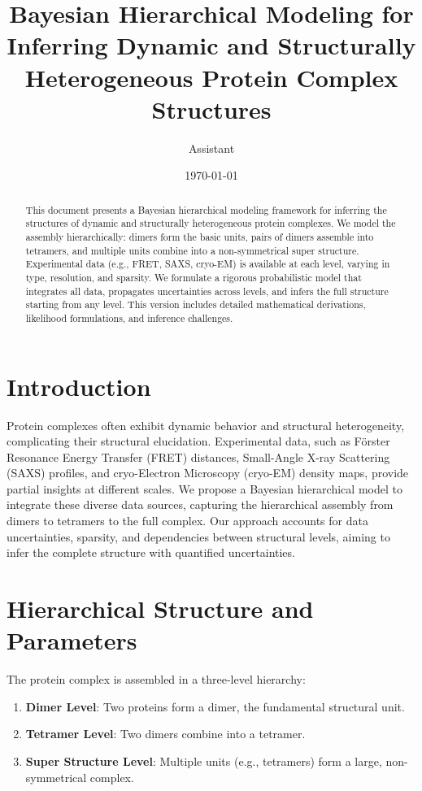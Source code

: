 \documentclass{article}
\title{Bayesian Hierarchical Modeling for Inferring Dynamic and Structurally Heterogeneous Protein Complex Structures}
\author{Assistant}
\date{\today}
\begin{document}
\maketitle

\begin{abstract}
This document presents a Bayesian hierarchical modeling framework for inferring the structures of dynamic and structurally heterogeneous protein complexes. We model the assembly hierarchically: dimers form the basic units, pairs of dimers assemble into tetramers, and multiple units combine into a non-symmetrical super structure. Experimental data (e.g., FRET, SAXS, cryo-EM) is available at each level, varying in type, resolution, and sparsity. We formulate a rigorous probabilistic model that integrates all data, propagates uncertainties across levels, and infers the full structure starting from any level. This version includes detailed mathematical derivations, likelihood formulations, and inference challenges.
\end{abstract}

\section{Introduction}
Protein complexes often exhibit dynamic behavior and structural heterogeneity, complicating their structural elucidation. Experimental data, such as Förster Resonance Energy Transfer (FRET) distances, Small-Angle X-ray Scattering (SAXS) profiles, and cryo-Electron Microscopy (cryo-EM) density maps, provide partial insights at different scales. We propose a Bayesian hierarchical model to integrate these diverse data sources, capturing the hierarchical assembly from dimers to tetramers to the full complex. Our approach accounts for data uncertainties, sparsity, and dependencies between structural levels, aiming to infer the complete structure with quantified uncertainties.

\section{Hierarchical Structure and Parameters}
The protein complex is assembled in a three-level hierarchy:
\begin{enumerate}
    \item \textbf{Dimer Level}: Two proteins form a dimer, the fundamental structural unit.
    \item \textbf{Tetramer Level}: Two dimers combine into a tetramer.
    \item \textbf{Super Structure Level}: Multiple units (e.g., tetramers) form a large, non-symmetrical complex.
\end{enumerate}
\end{document}
